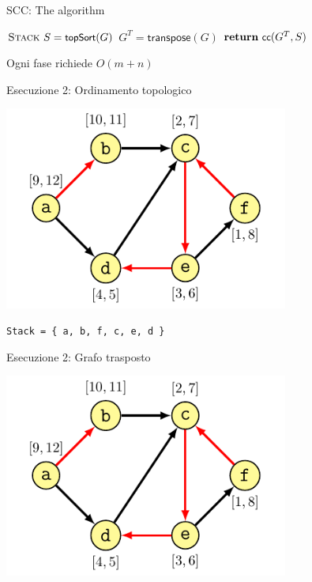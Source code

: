 \begin{frame}{SCC: The algorithm}
\vspace{-12pt}
\begin{Procedure}
\caption[A]{$\INTEGER[\,]$ \scc($\Graph\ G$)}

  $\textsc{Stack}\ S = \textsf{{\small topSort}}(G)$
  $G^T = \textsf{transpose}(G)$
  $\Return\ \connectedcomponents(G^T, S)$

\end{Procedure}

\BIL
\item Ogni fase richiede $O(m+n)$
\EIL

\end{frame}

\begin{frame}{Esecuzione 2: Ordinamento topologico}

\centering\includegraphics[width=0.7\textwidth,page=1]{scc4.pdf}

\Large
\texttt{Stack = \{ a, b, f, c, e, d \} }
\end{frame}

\begin{frame}{Esecuzione 2: Grafo trasposto}

\centering\includegraphics[width=0.7\textwidth,page=3]{scc4.pdf}


\end{frame}

